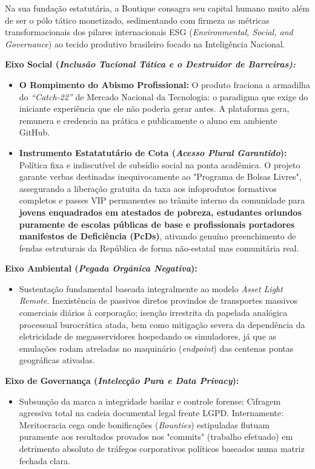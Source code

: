 \documentclass[../main.tex]{subfiles}
\begin{document}
Na sua fundação estatutária, a Boutique consagra seu capital humano muito além de ser o pólo tático monetizado, sedimentando com firmeza as métricas transformacionais dos pilares internacionais ESG (\textit{Environmental, Social, and Governance}) ao tecido produtivo brasileiro focado na Inteligência Nacional.

\textbf{Eixo Social (\textit{Inclusão Tacional Tática e o Destruidor de Barreiras):}}
\begin{itemize}
    \item \textbf{O Rompimento do Abismo Profissional:} O produto fraciona a armadilha do \textit{“Catch-22”} de Mercado Nacional da Tecnologia: o paradigma que exige do iniciante experiência que ele não poderia gerar antes. A plataforma gera, remunera e credencia na prática e publicamente o aluno em ambiente GitHub.
    \item \textbf{Instrumento Estatatutário de Cota (\textit{Acesso Plural Garantido}):} Política fixa e indiscutível de subsídio social na ponta acadêmica. O projeto garante verbas destinadas inequivocamente ao "Programa de Bolsas Livres", assegurando a liberação gratuita da taxa aos infoprodutos formativos completos e passes VIP permanentes no trâmite interno da comunidade para \textbf{jovens enquadrados em atestados de pobreza, estudantes oriundos puramente de escolas públicas de base e profissionais portadores manifestos de Deficiência (PcDs)}, ativando genuíno preenchimento de fendas estruturais da República de forma não-estatal mas comunitária real.
\end{itemize}

\textbf{Eixo Ambiental (\textit{Pegada Orgânica Negativa}):}
\begin{itemize}
    \item Sustentação fundamental baseada integralmente ao modelo \textit{Asset Light Remote}. Inexistência de passivos diretos provindos de transportes massivos comerciais diários à corporação; isenção irrestrita da papelada analógica processual burocrática atada, bem como mitigação severa da dependência da eletricidade de megasservidores hospedando os simuladores, já que as emulações rodam atreladas no maquinário (\textit{endpoint}) das centenas pontas geográficas ativadas.
\end{itemize}

\textbf{Eixo de Governança (\textit{Intelecção Pura e Data Privacy}):}
\begin{itemize}
    \item Subsunção da marca a integridade basilar e controle forense; Cifragem agressiva total na cadeia documental legal frente LGPD. Internamente: Meritocracia cega onde bonificações (\textit{Bounties}) estipuladas flutuam puramente aos resultados provados nos "commits" (trabalho efetuado) em detrimento absoluto de tráfegos corporativos políticos baseados numa matriz fechada clara.
\end{itemize}
\end{document}
